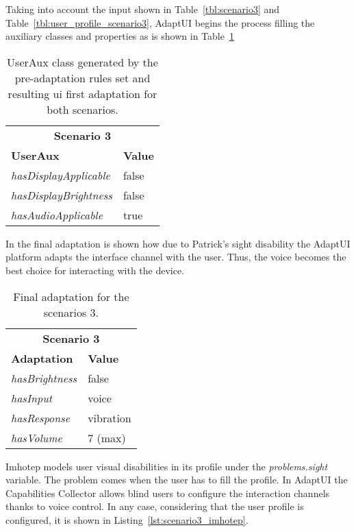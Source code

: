 Taking into account the input shown in Table~\ref{tbl:scenario3} and
Table~\ref{tbl:user_profile_scenario3}, AdaptUI begins the process filling
the auxiliary classes and properties as is shown in
Table~\ref{tbl:userAux_scenario3}


\begin{table}
 \caption{UserAux class generated by the pre-adaptation rules set and resulting
 \ac{ui} first adaptation for both scenarios.}
 \label{tbl:userAux_scenario3}
 \footnotesize
 \centering
\begin{tabular}{l l}
  \hline 
	\multicolumn{2}{c}{\textbf{Scenario 3}}	\\
	\textbf{UserAux} 	& \textbf{Value}\\
  \hline
  \textit{hasDisplayApplicable} & false		\\
  \textit{hasDisplayBrightness}	& false		\\
  \textit{hasAudioApplicable}	& true		\\
  \hline
\end{tabular}
\end{table}

In the final adaptation is shown how due to Patrick's sight disability the 
AdaptUI platform adapts the interface channel with the user. Thus, the voice
becomes the best choice for interacting with the device.

\begin{table}
 \caption{Final adaptation for the scenarios 3.}
 \label{tbl:final_adaptation_scenario3}
 \footnotesize
 \centering
\begin{tabular}{l l}
  \hline 
	\multicolumn{2}{c}{\textbf{Scenario 3}}	\\
	\textbf{Adaptation} & \textbf{Value}\\
  \hline
  \textit{hasBrightness}& false		\\
  \textit{hasInput}	& voice 	\\
  \textit{hasResponse}	& vibration	\\
  \textit{hasVolume}	& $7$ (max) 	\\
  \hline
\end{tabular}
\end{table}

Imhotep models user visual disabilities in its profile under the
\textit{problems.sight} variable. The problem comes when the user has to fill 
the profile. In AdaptUI the Capabilities Collector allows blind users to 
configure the interaction channels thanks to voice control. In any case, 
considering that the user profile is configured, it is shown in 
Listing~\ref{lst:scenario3_imhotep}.

